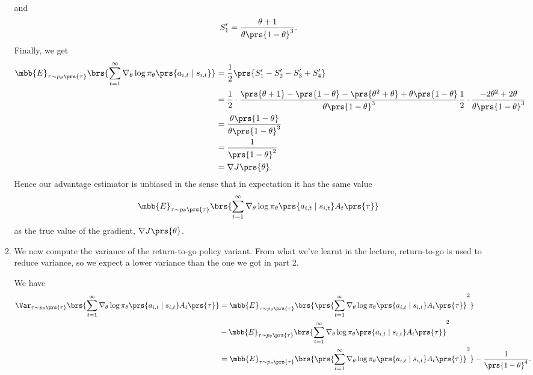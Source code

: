\documentclass[10pt]{article}
\theoremstyle{definition}
\begin{document}
\begin{enumerate}
\begin{enumerate}[label=(\alph*)]
\begin{align*}
\end{align*}
and
\begin{align*}
S'_1 = \frac{\theta + 1}{\theta \prs{1-\theta}^3} \text{.}
\end{align*}
Finally, we get
\begin{align*}
\mbb{E}_{\tau \sim p_\theta\prs{\tau}}\brs{\sum_{t=1}^{\infty} \nabla_{\theta} \log \pi_\theta \prs{a_{i,t} \mid s_{i,t}}}
&=
\frac{1}{2} \prs{S'_1 - S'_2 - S'_3 + S'_4}
\\&=
\frac{1}{2} \cdot \frac{\prs{\theta+1} - \prs{1-\theta} - \prs{\theta^2 + \theta} + \theta\prs{1-\theta}}{\theta \prs{1-\theta}^3}
\frac{1}{2} \cdot \frac{-2 \theta^2 + 2\theta}{\theta \prs{1-\theta}^3}
\\&=
\frac{\theta\prs{1-\theta}}{\theta \prs{1-\theta}^3}
\\&=
\frac{1}{\prs{1-\theta}^2}
\\&=
\nabla J\prs{\theta} \text{.}
\end{align*}
Hence our advantage estimator is unbiased in the sense that in expectation it has the same value
\[\mbb{E}_{\tau \sim p_\theta\prs{\tau}}\brs{\sum_{t=1}^{\infty} \nabla_{\theta} \log \pi_\theta \prs{a_{i,t} \mid s_{i,t}} A_t\prs{\tau}}\]
as the true value of the gradient, $\nabla J\prs{\theta}$.

\item
We now compute the variance of the return-to-go policy variant. From what we've learnt in the lecture, return-to-go is used to reduce variance, so we expect a lower variance than the one we got in part 2.

We have
\begin{align*}
\Var_{\tau \sim p_\theta\prs{\tau}}\brs{\sum_{t=1}^{\infty} \nabla_{\theta} \log \pi_\theta \prs{a_{i,t} \mid s_{i,t}} A_t\prs{\tau}}
&=
\mbb{E}_{\tau \sim p_\theta\prs{\tau}}\brs{\prs{\sum_{t=1}^{\infty} \nabla_{\theta} \log \pi_\theta \prs{a_{i,t} \mid s_{i,t}} A_t\prs{\tau}}^2}
\\&-
\mbb{E}_{\tau \sim p_\theta\prs{\tau}}\brs{\sum_{t=1}^{\infty} \nabla_{\theta} \log \pi_\theta \prs{a_{i,t} \mid s_{i,t}} A_t\prs{\tau}}^2
\\&= \mbb{E}_{\tau \sim p_\theta\prs{\tau}}\brs{\prs{\sum_{t=1}^{\infty} \nabla_{\theta} \log \pi_\theta \prs{a_{i,t} \mid s_{i,t}} A_t\prs{\tau}}^2} - \frac{1}{\prs{1-\theta}^4} \text{.}
\end{align*}


\end{enumerate}
\end{enumerate}
\end{document}

